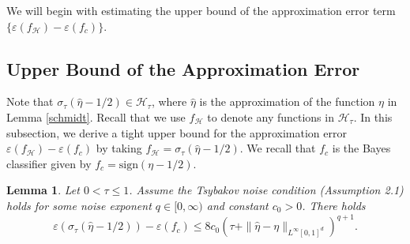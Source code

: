 \documentclass{article}
\newtheorem{lemma}{Lemma}
\begin{document}
We will begin with estimating the upper bound of the approximation error term $\{\varepsilon(f_\mathcal{H}) - \varepsilon(f_c)\}$.

\subsection{Upper Bound of the Approximation Error}\label{subsec:approx}
Note that $\sigma_\tau(\widehat{\eta}-1/2) \in \mathcal{H}_\tau$, where $\widehat{\eta}$ is the approximation of the function $\eta$ in Lemma \ref{schmidt}. 
Recall that we use $f_\mathcal{H}$ to denote any functions in $\mathcal{H}_\tau$. In this subsection, we derive a tight upper bound for the approximation error $\varepsilon(f_\mathcal{H})- \varepsilon(f_c)$ by taking $f_\mathcal{H} = \sigma_\tau(\widehat{\eta}-1/2)$. We recall that $f_c$ is the Bayes classifier given by $f_c = \text{sign}\left(\eta - 1/2\right)$. 

\begin{lemma}\label{lemma:approx}
    Let $0<\tau\leq 1$. 
    Assume the Tsybakov noise condition (Assumption 2.1) holds for some noise 
    exponent $q\in [0,\infty)$ and constant $c_0>0$. There holds
    \begin{equation}\label{approx_eqn}    \varepsilon\left(\sigma_\tau\left(\widehat{\eta} -1/2\right)\right)- \varepsilon(f_c) \leq 
    8c_0\left(\tau +\|\widehat{\eta}-\eta\|_{L^\infty[0,1]^d}\right)^{q+1}.
    \end{equation}
\end{lemma}
\end{document}
